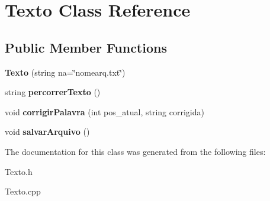 \hypertarget{classTexto}{}\section{Texto Class Reference}
\label{classTexto}
\subsection*{Public Member Functions}
\begin{DoxyCompactItemize}
\item 
{\bfseries Texto} (string na=\char`\"{}nomearq.\+txt\char`\"{})\hypertarget{classTexto_a5ed964db73ab42ba25243836e87ab78b}{}\label{classTexto_a5ed964db73ab42ba25243836e87ab78b}

\item 
string {\bfseries percorrer\+Texto} ()\hypertarget{classTexto_a6152fb08d561060760766c3083f6489c}{}\label{classTexto_a6152fb08d561060760766c3083f6489c}

\item 
void {\bfseries corrigir\+Palavra} (int pos\+\_\+atual, string corrigida)\hypertarget{classTexto_aa01fd01702eb3106f977c1c22ff757d2}{}\label{classTexto_aa01fd01702eb3106f977c1c22ff757d2}

\item 
void {\bfseries salvar\+Arquivo} ()\hypertarget{classTexto_aa637986e50d826319f321167dfaf2d9c}{}\label{classTexto_aa637986e50d826319f321167dfaf2d9c}

\end{DoxyCompactItemize}


The documentation for this class was generated from the following files\+:\begin{DoxyCompactItemize}
\item 
Texto.\+h\item 
Texto.\+cpp\end{DoxyCompactItemize}
